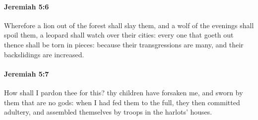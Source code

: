 		\paragraph{Jeremiah 5:6} %
			\label{JEREMIAH-5-6}

			Wherefore a lion out of the forest shall slay them, and a wolf of the evenings shall spoil them, a leopard shall watch over their cities: every one that goeth out thence shall be torn in pieces: because their transgressions are many, and their backslidings are increased.


		\paragraph{Jeremiah 5:7} %
			\label{JEREMIAH-5-7}

			How shall I pardon thee for this? thy children have forsaken me, and sworn by them that are no gods: when I had fed them to the full, they then committed adultery, and assembled themselves by troops in the harlots’ houses.

